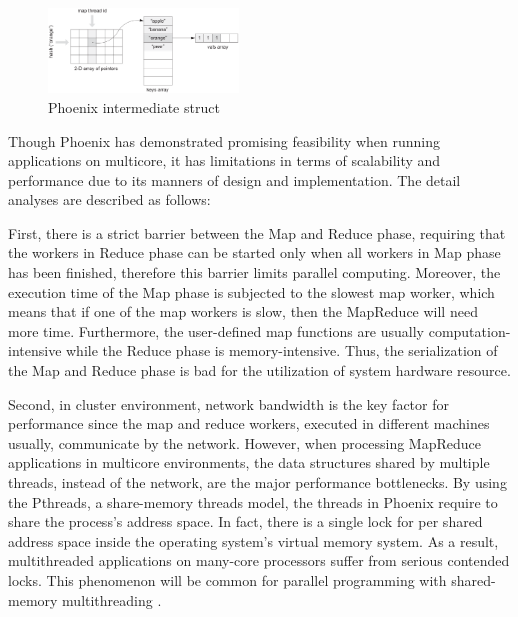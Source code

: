 \begin{figure}[!h!t]  
    \centering
    \includegraphics[width=0.45\textwidth]{eps/phoenix_intermediate.eps}
    \caption{Phoenix intermediate struct}
    \label{fig:phoenix:intermediate}
\end{figure}

Though Phoenix has demonstrated promising feasibility when running  applications on multicore,  it has limitations in terms of scalability and performance due to its manners of design and implementation.
The detail analyses are described as follows:

First, there is a strict barrier between the Map and Reduce phase,
requiring that the workers in Reduce phase can
be started only when all workers in Map phase has been finished, 
therefore this barrier limits parallel computing.
Moreover,  the execution time of the Map phase is subjected to the slowest map worker, which means that if one of the map workers is slow, then the MapReduce will need more time.
Furthermore, the user-defined map functions are usually computation-intensive while the Reduce phase is memory-intensive. Thus, the serialization of the Map and Reduce phase is bad for the utilization of system hardware resource.

Second,  in cluster environment, network bandwidth is the key factor for performance since the map and reduce workers, executed in different machines usually,  communicate by the network.
However, when processing MapReduce applications in multicore environments,  the data structures shared by multiple threads, instead of the network, are the major performance bottlenecks.
By using the Pthreads,  a share-memory threads model, 
the threads in Phoenix require to share the process's address space.
In fact, there is a single lock for per shared address space inside the operating system’s virtual memory system. 
As a result, multithreaded applications on many-core processors suffer from serious contended locks.
This phenomenon will be common for parallel programming with shared-memory
multithreading \cite{clements2013radixvm}.

